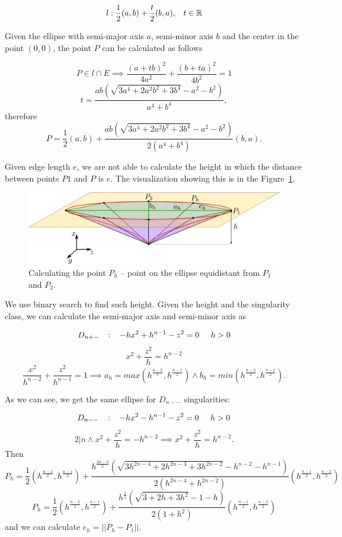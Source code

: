 $$l: \frac{1}{2}(a,b) + \frac{t}{2}(b,a), \hspace{3mm} t \in \mathbb{R}$$

Given the ellipse with semi-major axis $a$, 
semi-minor axis $b$ and the center in the point $(0, 0)$, the point $P$ can be 
calculated as follows

$$P \in l \cap E \implies 
\frac{(a+tb)^2}{4a^2} + \frac{(b+ta)^2}{4b^2} = 1$$
$$t=\frac{ab(\sqrt{3a^4+2a^2b^2+3b^4}-a^2-b^2)}{a^4+b^4},$$
therefore 
$$P=\frac{1}{2}(a,b) + \frac{ab(\sqrt{3a^4+2a^2b^2+3b^4}-a^2-b^2)}{2(a^4+b^4)}(b,a).$$

Given edge length $e$, we are not able to calculate the height in which the distance
between points $P1$ and $P$ is $e$. The visualization showing this is in the Figure~\ref{img:17}.

\begin{figure}
    \centerline{\includegraphics[scale=0.5]{images/img17}}
    \caption[Calculating the point $P_h$]
    {Calculating the point $P_h$ -- point on the ellipse equidistant from $P_1$ and $P_2$.}
    \label{img:17}
\end{figure}

We use binary search to find such height.
Given the height and the singularity class, we can calculate the semi-major axis
and semi-minor axis as 

$$D_{n+-} \hspace{3mm} :\hspace{3mm}  -hx^2+h^{n-1}-z^2 = 0 \hspace{5mm} h>0$$
$$x^2 + \frac{z^2}{h} = h^{n-2}$$
$$\frac{x^2}{h^{n-2}} + \frac{z^2}{h^{n-1}} = 1 \implies a_h=max(h^\frac{n-2}{2}, h^\frac{n-1}{2}) \land b_h=min(h^\frac{n-2}{2}, h^\frac{n-1}{2}).$$

As we can see, we get the same ellipse for $D_{n--}$ singularities:

$$D_{n--} \hspace{3mm} :\hspace{3mm}  -hx^2-h^{n-1}-z^2 = 0 \hspace{5mm} h>0$$
$$2|n \land x^2 + \frac{z^2}{h} = -h^{n-2} \implies x^2 + \frac{z^2}{h} = h^{n-2}.$$
Then 
$$P_h=\frac{1}{2}(h^\frac{n-2}{2},h^\frac{n-1}{2}) + \frac{h^\frac{2n-3}{2}(\sqrt{3h^{2n-4}+2h^{2n-3}+3h^{2n-2}}-h^{n-2}-h^{n-1})}{2(h^{2n-4}+h^{2n-2})}(h^\frac{n-1}{2},h^\frac{n-2}{2})$$
$$P_h=\frac{1}{2}(h^\frac{n-2}{2},h^\frac{n-1}{2}) + \frac{h^\frac{1}{2}(\sqrt{3+2h+3h^2}-1-h)}{2(1+h^2)}(h^\frac{n-1}{2},h^\frac{n-2}{2})$$
and we can calculate $e_h=||P_h-P_1||$.

